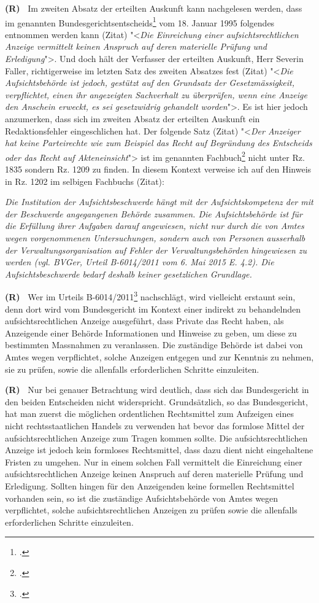 \documentclass[paper=a4,fontsize=12pt, oneside, numbers=noenddot]{scrbook}
\newcounter{rz}
\newcommand{\Rz}{
	\addtocounter{rz}{1}\textbf{(R\arabic{rz})~}
}
\begin{document}
\Rz Im zweiten Absatz der erteilten Auskunft kann nachgelesen werden, dass im genannten Bundesgerichtsentscheids\footcite[E. 2a]{BGE121I42} vom 18. Januar 1995 folgendes entnommen werden kann (Zitat) "<\textit{Die Einreichung einer aufsichtsrechtlichen Anzeige vermittelt keinen Anspruch auf deren materielle Prüfung und Erledigung}">. Und doch hält der Verfasser der erteilten Auskunft, Herr Severin Faller, richtigerweise im letzten Satz des zweiten Absatzes fest (Zitat) "<\textit{Die Aufsichtsbehörde ist jedoch, gestützt auf den Grundsatz der Gesetzmässigkeit, verpflichtet, einen ihr angezeigten Sachverhalt zu überprüfen, wenn eine Anzeige den Anschein erweckt, es sei gesetzwidrig gehandelt worden}">. Es ist hier jedoch anzumerken, dass sich im zweiten Absatz der erteilten Auskunft ein Redaktionsfehler eingeschlichen hat. Der folgende Satz (Zitat) "<\textit{Der Anzeiger hat keine Parteirechte wie zum Beispiel das Recht auf Begründung des Entscheids oder das Recht auf Akteneinsicht}"> ist im genannten Fachbuch\footcite{2008:Haeflin:AllgVerwaltungsrecht} nicht unter  Rz. 1835 sondern Rz. 1209 zu finden. In diesem Kontext verweise ich auf den Hinweis in Rz. 1202 im selbigen Fachbuchs (Zitat):
\begin{addmargin}[2.5em]{0em}\emph{Die Institution der Aufsichtsbeschwerde hängt mit der Aufsichtskompetenz der mit der Beschwerde angegangenen Behörde zusammen. Die Aufsichtsbehörde ist für die Erfüllung ihrer Aufgaben darauf angewiesen, nicht nur durch die von Amtes wegen vorgenommenen Untersuchungen, sondern auch von Personen ausserhalb der Verwaltungsorganisation auf Fehler der Verwaltungsbehörden hingewiesen zu werden (vgl. BVGer, Urteil B-6014/2011 vom 6. Mai 2015 E. 4.2). Die Aufsichtsbeschwerde bedarf deshalb keiner gesetzlichen Grundlage.}
\end{addmargin}
\Rz Wer im Urteils B-6014/2011\footcite[E. 4.2]{BGE6014:20111} nachschlägt, wird vielleicht erstaunt sein, denn dort wird vom Bundesgericht im Kontext einer indirekt zu behandelnden aufsichtsrechtlichen Anzeige ausgeführt, dass Private das Recht haben, als Anzeigende einer Behörde Informationen und Hinweise zu geben, um diese zu bestimmten Massnahmen zu veranlassen. Die zuständige Behörde ist dabei von Amtes wegen verpflichtet, solche Anzeigen entgegen und zur Kenntnis zu nehmen, sie zu prüfen, sowie die allenfalls erforderlichen Schritte einzuleiten. 

\Rz Nur bei genauer Betrachtung wird deutlich, dass sich das Bundesgericht in den beiden Entscheiden nicht widerspricht. Grundsätzlich, so das Bundesgericht, hat man zuerst die möglichen ordentlichen Rechtsmittel zum Aufzeigen eines nicht rechtsstaatlichen Handels zu verwenden hat bevor das formlose Mittel der aufsichtsrechtlichen Anzeige zum Tragen kommen sollte. Die aufsichtsrechtlichen Anzeige ist jedoch kein formloses Rechtsmittel, dass dazu dient nicht eingehaltene Fristen zu umgehen. Nur in einem solchen Fall vermittelt die Einreichung einer aufsichtsrechtlichen Anzeige keinen Anspruch auf deren materielle Prüfung und Erledigung. Sollten hingen für den Anzeigenden keine formellen Rechtsmittel vorhanden sein, so ist die zuständige Aufsichtsbehörde von Amtes wegen verpflichtet, solche aufsichtsrechtlichen Anzeigen zu prüfen sowie die allenfalls erforderlichen Schritte einzuleiten.
\end{document}
